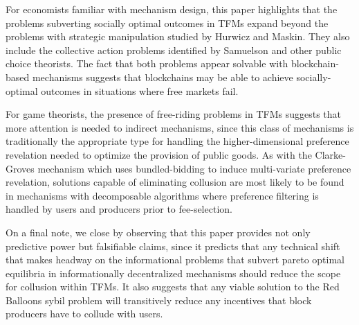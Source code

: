 \documentclass[oneside]{article}   	%
\begin{document}
For economists familiar with mechanism design, this paper highlights that the problems subverting socially optimal outcomes in TFMs expand beyond the problems with strategic manipulation studied by Hurwicz and Maskin. They also include the collective action problems identified by Samuelson and other public choice theorists. The fact that both problems appear solvable with blockchain-based mechanisms suggests that blockchains may be able to achieve socially-optimal outcomes in situations where free markets fail.

For game theorists, the presence of free-riding problems in TFMs suggests that more attention is needed to indirect mechanisms, since this class of mechanisms is traditionally the appropriate type for handling the higher-dimensional preference revelation needed to optimize the provision of public goods. As with the Clarke-Groves mechanism which uses bundled-bidding to induce multi-variate preference revelation, solutions capable of eliminating collusion are most likely to be found in mechanisms with decomposable algorithms where preference filtering is handled by users and producers prior to fee-selection.

On a final note, we close by observing that this paper provides not only predictive power but falsifiable claims, since it predicts that any technical shift that makes headway on the informational problems that subvert pareto optimal equilibria in informationally decentralized mechanisms should reduce the scope for collusion within TFMs. It also suggests that any viable solution to the Red Balloons sybil problem will transitively reduce any incentives that block producers have to collude with users.

\cleardoublepage

\end{document}
